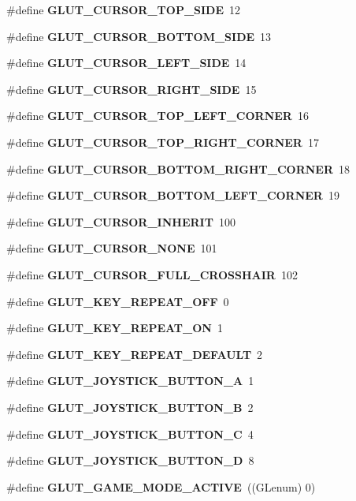 \begin{DoxyCompactItemize}
\item 
\#define {\bf G\+L\+U\+T\+\_\+\+C\+U\+R\+S\+O\+R\+\_\+\+T\+O\+P\+\_\+\+S\+I\+DE}~12
\item 
\#define {\bf G\+L\+U\+T\+\_\+\+C\+U\+R\+S\+O\+R\+\_\+\+B\+O\+T\+T\+O\+M\+\_\+\+S\+I\+DE}~13
\item 
\#define {\bf G\+L\+U\+T\+\_\+\+C\+U\+R\+S\+O\+R\+\_\+\+L\+E\+F\+T\+\_\+\+S\+I\+DE}~14
\item 
\#define {\bf G\+L\+U\+T\+\_\+\+C\+U\+R\+S\+O\+R\+\_\+\+R\+I\+G\+H\+T\+\_\+\+S\+I\+DE}~15
\item 
\#define {\bf G\+L\+U\+T\+\_\+\+C\+U\+R\+S\+O\+R\+\_\+\+T\+O\+P\+\_\+\+L\+E\+F\+T\+\_\+\+C\+O\+R\+N\+ER}~16
\item 
\#define {\bf G\+L\+U\+T\+\_\+\+C\+U\+R\+S\+O\+R\+\_\+\+T\+O\+P\+\_\+\+R\+I\+G\+H\+T\+\_\+\+C\+O\+R\+N\+ER}~17
\item 
\#define {\bf G\+L\+U\+T\+\_\+\+C\+U\+R\+S\+O\+R\+\_\+\+B\+O\+T\+T\+O\+M\+\_\+\+R\+I\+G\+H\+T\+\_\+\+C\+O\+R\+N\+ER}~18
\item 
\#define {\bf G\+L\+U\+T\+\_\+\+C\+U\+R\+S\+O\+R\+\_\+\+B\+O\+T\+T\+O\+M\+\_\+\+L\+E\+F\+T\+\_\+\+C\+O\+R\+N\+ER}~19
\item 
\#define {\bf G\+L\+U\+T\+\_\+\+C\+U\+R\+S\+O\+R\+\_\+\+I\+N\+H\+E\+R\+IT}~100
\item 
\#define {\bf G\+L\+U\+T\+\_\+\+C\+U\+R\+S\+O\+R\+\_\+\+N\+O\+NE}~101
\item 
\#define {\bf G\+L\+U\+T\+\_\+\+C\+U\+R\+S\+O\+R\+\_\+\+F\+U\+L\+L\+\_\+\+C\+R\+O\+S\+S\+H\+A\+IR}~102
\item 
\#define {\bf G\+L\+U\+T\+\_\+\+K\+E\+Y\+\_\+\+R\+E\+P\+E\+A\+T\+\_\+\+O\+FF}~0
\item 
\#define {\bf G\+L\+U\+T\+\_\+\+K\+E\+Y\+\_\+\+R\+E\+P\+E\+A\+T\+\_\+\+ON}~1
\item 
\#define {\bf G\+L\+U\+T\+\_\+\+K\+E\+Y\+\_\+\+R\+E\+P\+E\+A\+T\+\_\+\+D\+E\+F\+A\+U\+LT}~2
\item 
\#define {\bf G\+L\+U\+T\+\_\+\+J\+O\+Y\+S\+T\+I\+C\+K\+\_\+\+B\+U\+T\+T\+O\+N\+\_\+A}~1
\item 
\#define {\bf G\+L\+U\+T\+\_\+\+J\+O\+Y\+S\+T\+I\+C\+K\+\_\+\+B\+U\+T\+T\+O\+N\+\_\+B}~2
\item 
\#define {\bf G\+L\+U\+T\+\_\+\+J\+O\+Y\+S\+T\+I\+C\+K\+\_\+\+B\+U\+T\+T\+O\+N\+\_\+C}~4
\item 
\#define {\bf G\+L\+U\+T\+\_\+\+J\+O\+Y\+S\+T\+I\+C\+K\+\_\+\+B\+U\+T\+T\+O\+N\+\_\+D}~8
\item 
\#define {\bf G\+L\+U\+T\+\_\+\+G\+A\+M\+E\+\_\+\+M\+O\+D\+E\+\_\+\+A\+C\+T\+I\+VE}~((G\+Lenum) 0)

\end{DoxyCompactItemize}
